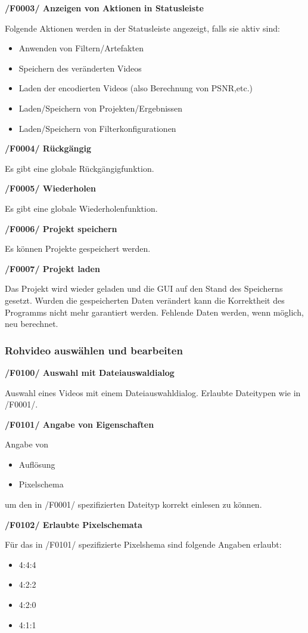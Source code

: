 \documentclass[parskip=full]{scrartcl}
\begin{document}
\textbf{/F0003/ Anzeigen von Aktionen in Statusleiste}

Folgende Aktionen werden in der Statusleiste angezeigt, falls sie aktiv sind:
\begin{itemize}
\item Anwenden von Filtern/Artefakten
\item Speichern des veränderten Videos
\item Laden der encodierten Videos (also Berechnung von PSNR,etc.)
\item Laden/Speichern von Projekten/Ergebnissen
\item Laden/Speichern von Filterkonfigurationen
\end{itemize}

\textbf{/F0004/ Rückgängig}

Es gibt eine globale Rückgängigfunktion.

\textbf{/F0005/ Wiederholen}

Es gibt eine globale Wiederholenfunktion.

\textbf{/F0006/ Projekt speichern}

Es können Projekte gespeichert werden.

\textbf{/F0007/ Projekt laden}

Das Projekt wird wieder geladen und die GUI auf den Stand des
Speicherns gesetzt. Wurden die gespeicherten Daten verändert kann die Korrektheit
des Programms nicht mehr garantiert werden. Fehlende Daten werden, wenn möglich, neu berechnet. 

\subsubsection{Rohvideo auswählen und bearbeiten}
\textbf{/F0100/ Auswahl mit Dateiauswaldialog}

Auswahl eines Videos mit einem Dateiauswahldialog. Erlaubte Dateitypen wie in /F0001/.

\textbf{/F0101/ Angabe von Eigenschaften}

Angabe von
\begin{itemize}
\item Auflösung
\item Pixelschema
\end{itemize}
um den in /F0001/ spezifizierten Dateityp korrekt einlesen zu können.

\textbf{/F0102/ Erlaubte Pixelschemata}

Für das in /F0101/ spezifizierte Pixelshema sind folgende Angaben erlaubt:
\begin{itemize}
\item 4:4:4
\item 4:2:2
\item 4:2:0
\item 4:1:1
\end{itemize}
\end{document}
